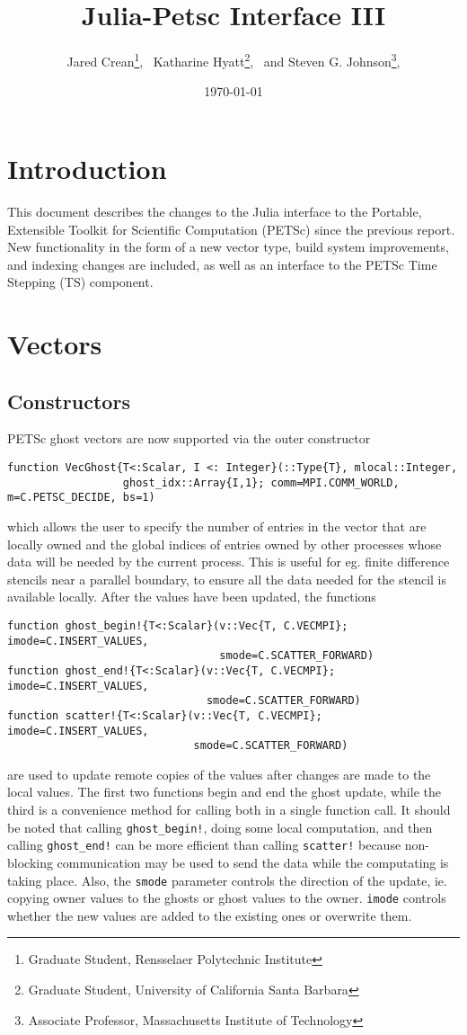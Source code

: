 \documentclass{article}
\title{Julia-Petsc Interface III}
\author{
  Jared Crean\thanks{Graduate Student, Rensselaer Polytechnic Institute}, \
  Katharine Hyatt\thanks{Graduate Student, University of California Santa Barbara}, \ and
  Steven G. Johnson\thanks{Associate Professor, Massachusetts Institute of Technology},
}
\date{\today}
\newcommand{\ttt}{\texttt}
\begin{document}
\maketitle

\section{Introduction} \label{sec:intro}
This document describes the changes to the Julia interface to the Portable, Extensible Toolkit for Scientific Computation (PETSc) since the previous report.
New functionality in the form of a new vector type, build system improvements, and indexing changes are included, as well as an interface to the PETSc Time Stepping (TS)
component.


\section{Vectors}
\subsection{Constructors}
PETSc ghost vectors are now supported via the outer constructor

\begin{verbatim}
function VecGhost{T<:Scalar, I <: Integer}(::Type{T}, mlocal::Integer, 
                  ghost_idx::Array{I,1}; comm=MPI.COMM_WORLD, m=C.PETSC_DECIDE, bs=1)
\end{verbatim}
\noindent which allows the user to specify the number of entries in the vector 
that are locally owned and the global indices of entries owned by other 
processes whose data will be needed by the current process.  This is useful
for eg. finite difference stencils near a parallel boundary, to ensure all the 
data needed for the stencil is available locally. After the values have been
updated, the functions

\begin{verbatim}
function ghost_begin!{T<:Scalar}(v::Vec{T, C.VECMPI}; imode=C.INSERT_VALUES,
                                 smode=C.SCATTER_FORWARD)
function ghost_end!{T<:Scalar}(v::Vec{T, C.VECMPI}; imode=C.INSERT_VALUES,
                               smode=C.SCATTER_FORWARD)
function scatter!{T<:Scalar}(v::Vec{T, C.VECMPI}; imode=C.INSERT_VALUES, 
                             smode=C.SCATTER_FORWARD)
\end{verbatim}

\noindent are used to update remote copies of the values after changes are made
to the local values.  The first two functions begin and end the ghost update, 
while the third is a convenience method for calling both in a single function 
call.  It should be noted that calling \texttt{ghost\_begin!}, doing some 
local computation, and then calling \texttt{ghost\_end!} can be more efficient
than calling \ttt{scatter!} because non-blocking communication may be used to
send the data while the computating is taking place.  
Also, the \texttt{smode} parameter controls the direction of
the update, ie. copying owner values to the ghosts or ghost values to the owner.
\texttt{imode} controls whether the new values are added to the existing 
ones or overwrite them.
\end{document}
